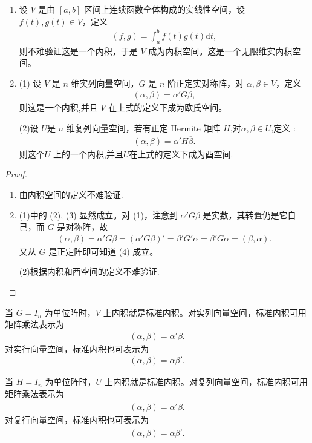 \documentclass[../../main.tex]{subfiles}
\begin{document}
\begin{example}\label{example:一些常见的内积及内积空间}
\begin{enumerate}
\item 设 \(V\) 是由 \([a,b]\) 区间上连续函数全体构成的实线性空间，设 \(f(t),g(t)\in V\)，定义
\begin{align*}
(f,g)=\int_{a}^{b}f(t)g(t)\mathrm{d}t,
\end{align*}
则不难验证这是一个内积，于是 \(V\) 成为内积空间。这是一个无限维实内积空间。

\item (1) 设 \(V\) 是 \(n\) 维实列向量空间，\(G\) 是 \(n\) 阶正定实对称阵，对 \(\alpha,\beta\in V\)，定义
\begin{align*}
(\alpha,\beta)=\alpha'G\beta,
\end{align*}
则这是一个内积,并且 \(V\) 在上式的定义下成为欧氏空间。

(2)设 \(U\)是 \(n\) 维复列向量空间，若有正定 Hermite 矩阵 \(H\),对$\alpha ,\beta \in U$,定义 :
\begin{align*}
(\alpha,\beta)=\alpha'H\overline{\beta}.
\end{align*}
则这个\(U\) 上的一个内积,并且$U$在上式的定义下成为酉空间.
\end{enumerate}
\end{example}
\begin{proof}
\begin{enumerate}
\item 由内积空间的定义不难验证.

\item (1)中的 (2), (3) 显然成立。对 (1)，注意到 \(\alpha'G\beta\) 是实数，其转置仍是它自己，而 \(G\) 是对称阵，故
\begin{align*}
(\alpha,\beta)=\alpha'G\beta=(\alpha'G\beta)'=\beta'G'\alpha=\beta'G\alpha=(\beta,\alpha).
\end{align*}
又从 \(G\) 是正定阵即可知道 (4) 成立。 

(2)根据内积和酉空间的定义不难验证.
\end{enumerate}
\end{proof}
\begin{remark}
当 \(G = I_n\) 为单位阵时，\(V\) 上内积就是标准内积。对实列向量空间，标准内积可用矩阵乘法表示为
\begin{align*}
(\alpha,\beta)=\alpha'\beta.
\end{align*}
对实行向量空间，标准内积也可表示为
\begin{align*}
(\alpha,\beta)=\alpha\beta'.
\end{align*}

当 \(H = I_n\) 为单位阵时，\(U\) 上内积就是标准内积。对复列向量空间，标准内积可用矩阵乘法表示为
\begin{align*}
(\alpha,\beta)=\alpha'\overline{\beta}.
\end{align*}
对复行向量空间，标准内积也可表示为
\begin{align*}
(\alpha,\beta)=\alpha\overline{\beta}'.
\end{align*} 
\end{remark}
\end{document}
